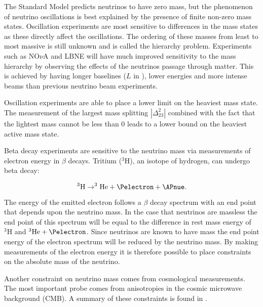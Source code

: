 The Standard Model predicts neutrinos to have zero mass, but the phenomenon of neutrino oscillations is best explained by the presence of finite non-zero mass states. Oscillation experiments are most sensitive to differences in the mass states as these directly affect the oscillations. The ordering of these masses from least to most massive is still unknown and is called the hierarchy problem. Experiments such as NO$\nu$A \cite{Ayres:2004js} and LBNE \cite{Adams:2013qkq} will have much improved sensitivity to the mass hierarchy by observing the effects of the neutrinos passage through matter. This is achieved by having longer baselines ($L$ in ), lower energies and more intense beams than previous neutrino beam experiments.

Oscillation experiments are able to place a lower limit on the heaviest mass state. The measurement of the largest mass splitting $|\Delta_{23}^{2}|$ combined with the fact that the lightest mass cannot be less than 0 leads to a lower bound on the heaviest active mass state.


Beta decay experiments are sensitive to the neutrino mass via measurements of electron energy in $\beta$ decays. Tritium ($^3\mbox{H}$), an isotope of hydrogen, can undergo beta decay:

\begin{equation}
  ^{3}\mbox{H} \rightarrow ^{3}\mbox{He} + \Pelectron + \APnue.
  \label{eq:particle-physics:neutrino-mass:tritium-decay}
\end{equation}

\noindent The energy of the emitted electron follows a $\beta$ decay spectrum with an end point that depends upon the neutrino mass. In the case that neutrinos are massless the end point of this spectrum will be equal to the difference in rest mass energy of $^{3}\mbox{H}$ and $^{3}\mbox{He} + \Pelectron$. Since neutrinos are known to have mass the end point energy of the electron spectrum will be reduced by the neutrino mass. By making measurements of the electron energy it is therefore possible to place constraints on the absolute mass of the neutrino.

Another constraint on neutrino mass comes from cosmological measurements. The most important probe comes from anisotropies in the cosmic microwave background (CMB). A summary of these constraints is found in .

